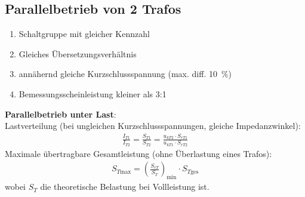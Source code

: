 \subsection{Parallelbetrieb von 2 Trafos}
    \begin{enumerate}
        \item Schaltgruppe mit gleicher Kennzahl
        \item Gleiches Übersetzungsverhältnis
        \item annähernd gleiche Kurzschlussspannung (max. diff. \SI{10}{\percent})
        \item Bemessungsscheinleistung kleiner als 3:1
    \end{enumerate}

    \textbf{Parallelbetrieb unter Last}: \\
    Lastverteilung (bei ungleichen Kurzschlussspannungen, gleiche Impedanzwinkel):
    \begin{align*}
        \frac{I_{T1}}{I_{T2}} = \frac{S_{T1}}{S_{T2}} = \frac{u_{kT2} \cdot S_{rT1}}{u_{kT1} \cdot S_{rT2}}
    \end{align*}
    Maximale übertragbare Gesamtleistung (ohne Überlastung eines Trafos):
    \begin{align*}
        S_{T\text{max}} = \left( \frac{S_{rT}}{S_T} \right)_{\text{min}} \cdot S_{T\text{ges}}
    \end{align*}
    wobei \(S_T\) die theoretische Belastung bei Vollleistung ist.
